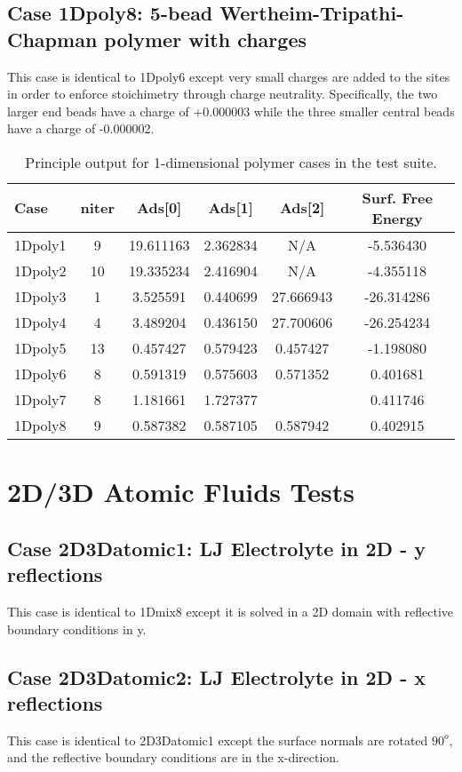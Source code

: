 \documentclass[10pt,onecolumn]{article}
\begin{document}
\subsection{Case 1Dpoly8: 5-bead Wertheim-Tripathi-Chapman polymer with charges}
This case is identical to 1Dpoly6 except very small charges are added to the sites in order to enforce stoichimetry through charge neutrality.  Specifically, the two larger end beads have a charge of +0.000003 while the three smaller central beads have a charge of -0.000002.  


\begin{table}[h]\begin{tabular}{|l|c|c|c|c|c|}
\hline
Case & niter & Ads[0]  & Ads[1] & Ads[2] & Surf. Free Energy  \\
\hline
1Dpoly1 & 9 & 19.611163 & 2.362834 & N/A & -5.536430   \\
1Dpoly2 & 10 & 19.335234 & 2.416904 & N/A & -4.355118   \\
1Dpoly3 & 1 & 3.525591 & 0.440699 & 27.666943 & -26.314286   \\
1Dpoly4 & 4 & 3.489204 & 0.436150 & 27.700606 & -26.254234 \\
1Dpoly5 & 13 & 0.457427 & 0.579423 & 0.457427 & -1.198080 \\
1Dpoly6 & 8 & 0.591319 & 0.575603 & 0.571352 &  0.401681\\
1Dpoly7 & 8 & 1.181661 & 1.727377 &  & 0.411746  \\
1Dpoly8 & 9 & 0.587382 & 0.587105 & 0.587942 & 0.402915 \\
\hline
\end{tabular}
\label{tab:table1}
\caption{Principle output for 1-dimensional polymer cases
in the test suite.}
\end{table}

\section{2D/3D Atomic Fluids Tests}
\subsection{Case 2D3Datomic1: LJ Electrolyte in 2D - y reflections}
This case is identical to 1Dmix8 except it is solved in a 2D domain with reflective boundary conditions in y.

\subsection{Case 2D3Datomic2: LJ Electrolyte in 2D - x reflections}
This case is identical to 2D3Datomic1 except the surface normals are rotated $90^o$, and the reflective boundary conditions are in the x-direction.
\end{document}
